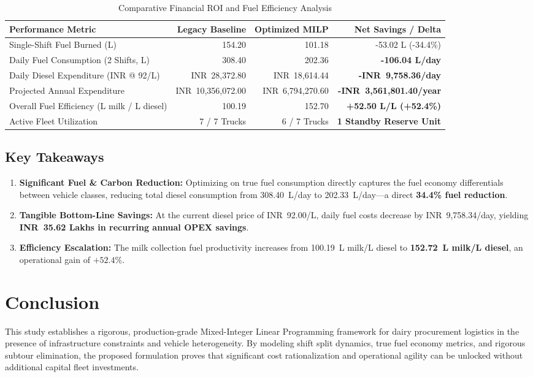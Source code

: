 \documentclass[11pt,a4paper]{article}
\begin{document}
\begin{table}[H]
\centering
\small
\caption{Comparative Financial ROI and Fuel Efficiency Analysis}
\label{tab:roi}
\begin{tabularx}{\textwidth}{X r r r}
\toprule
\textbf{Performance Metric} & \textbf{Legacy Baseline} & \textbf{Optimized MILP} & \textbf{Net Savings / Delta} \\
\midrule
Single-Shift Fuel Burned (L) & 154.20 & 101.18 & -53.02 L (-34.4\%) \\
Daily Fuel Consumption (2 Shifts, L) & 308.40 & 202.36 & \textbf{-106.04 L/day} \\
Daily Diesel Expenditure (INR @ 92/L) & INR~28,372.80 & INR~18,614.44 & \textbf{-INR~9,758.36/day} \\
Projected Annual Expenditure & INR~10,356,072.00 & INR~6,794,270.60 & \textbf{-INR~3,561,801.40/year} \\
Overall Fuel Efficiency (L milk / L diesel) & 100.19 & 152.70 & \textbf{+52.50 L/L (+52.4\%)} \\
Active Fleet Utilization & 7 / 7 Trucks & 6 / 7 Trucks & \textbf{1 Standby Reserve Unit} \\
\bottomrule
\end{tabularx}
\end{table}

\subsection{Key Takeaways}
\begin{enumerate}
    \item \textbf{Significant Fuel \& Carbon Reduction:} Optimizing on true fuel consumption directly captures the fuel economy differentials between vehicle classes, reducing total diesel consumption from 308.40~L/day to 202.33~L/day---a direct \textbf{34.4\% fuel reduction}.
    \item \textbf{Tangible Bottom-Line Savings:} At the current diesel price of INR~92.00/L, daily fuel costs decrease by INR~9,758.34/day, yielding \textbf{INR~35.62 Lakhs in recurring annual OPEX savings}.
    \item \textbf{Efficiency Escalation:} The milk collection fuel productivity increases from 100.19~L milk/L diesel to \textbf{152.72~L milk/L diesel}, an operational gain of $+52.4\%$.
\end{enumerate}

\section{Conclusion}
This study establishes a rigorous, production-grade Mixed-Integer Linear Programming framework for dairy procurement logistics in the presence of infrastructure constraints and vehicle heterogeneity. By modeling shift split dynamics, true fuel economy metrics, and rigorous subtour elimination, the proposed formulation proves that significant cost rationalization and operational agility can be unlocked without additional capital fleet investments.
\end{document}
